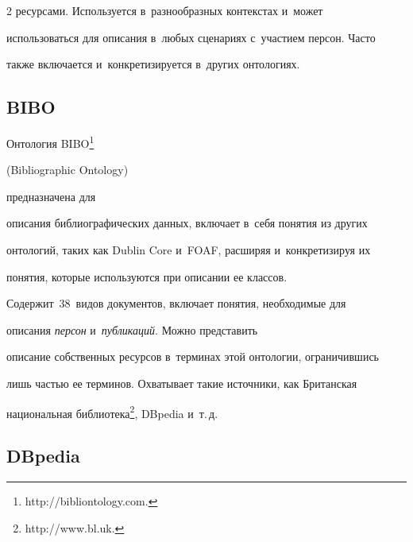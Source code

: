 \begin{multicols}{2}
ресурсами. Используется в~разнообразных контекстах и~может 

использоваться для описания в~любых сценариях с~участием персон. Часто 

также включается и~конкретизируется в~других онтологиях.




    

     \subsection*{BIBO}

     

     


     

     Онтология BIBO\footnote[1]{ {\sf http://bibliontology.com.}} 

     (Bibliographic Ontology)

     предназначена для 

описания библиографических данных, включает в~себя понятия из других 

онтологий, таких как Dublin Core и~FOAF, расширяя и~конкретизируя их 

понятия, которые используются при описании ее классов. 

Содержит~38~видов документов, вклю\-ча\-ет понятия, необходимые для 

описания \textit{персон} и~\textit{пуб\-ли\-ка\-ций}. Можно представить 

описание собственных ресурсов в~терминах этой онтологии, ограничившись 

лишь частью ее терминов. Охватывает такие источники, как Британская 

национальная библиотека\footnote{{\sf http://www.bl.uk.}}, DBpedia и~т.\,д.




    

     \subsection*{DBpedia}

     



\end{multicols}
